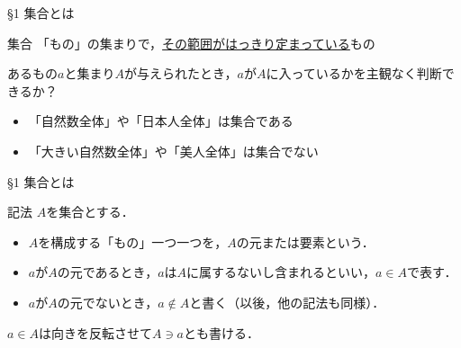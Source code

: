 \documentclass[uplatex,a4paper,dvipdfmx,aspectratio=169,11pt]{beamer}
\begin{document}
\begin{frame}[fragile]{\S 1 集合とは}
    \begin{block}{集合}
        「もの」の集まりで，\underline{その範囲がはっきり定まっている}もの
    \end{block}
    あるもの$a$と集まり$A$が与えられたとき，$a$が$A$に入っているかを主観なく判断できるか？
    \begin{itemize}
        \item 「自然数全体」や「日本人全体」は集合である
        \item 「大きい自然数全体」や「美人全体」は集合でない 
    \end{itemize}
\end{frame}

\begin{frame}[fragile]{\S 1 集合とは}
    \begin{block}{記法}
        $A$を集合とする．
        \begin{itemize}
            \item $A$を構成する「もの」一つ一つを，$A$の\alert{元}または\alert{要素}という．
            \item $a$が$A$の元であるとき，$a$は$A$に\alert{属する}ないし\alert{含まれる}といい，$a \in A$で表す．
            \item $a$が$A$の元でないとき，$a \notin A$と書く（以後，他の記法も同様）．
        \end{itemize}
    \end{block}
    $a \in A$は向きを反転させて$A \ni a$とも書ける．


\end{frame}
\end{document}
